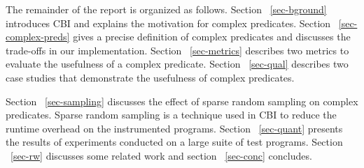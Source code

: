 The remainder of the report is organized as follows.  Section ~\ref{sec-bground} introduces CBI and explains the motivation for complex predicates.  Section ~\ref{sec-complex-preds} gives a precise definition of complex predicates and discusses the trade-offs in our implementation.  Section ~\ref{sec-metrics} describes two metrics to evaluate the usefulness of a complex predicate.  Section ~\ref{sec-qual} describes two case studies that demonstrate the usefulness of complex predicates.  

Section ~\ref{sec-sampling} discusses the effect of sparse random sampling on complex predicates.  Sparse random sampling is a technique used in CBI to reduce the runtime overhead on the instrumented programs.  Section ~\ref{sec-quant} presents the results of experiments conducted on a large suite of test programs.  Section ~\ref{sec-rw} discusses some related work and section ~\ref{sec-conc} concludes.